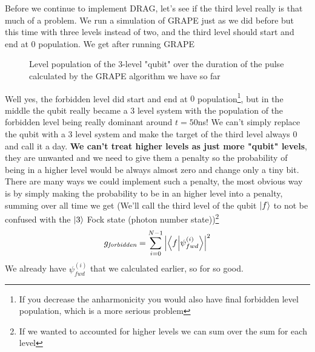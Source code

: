 Before we continue to implement DRAG, let's see if the third level really is that much of a problem. We run a simulation of GRAPE just as we did before but this time with three levels instead of two, and the third level should start and end at 0 population. We get after running GRAPE
\begin{figure}[H]
    \begin{center}
        
    \end{center}
    \caption{Level population of the 3-level "qubit" over the duration of the pulse calculated by the GRAPE algorithm we have so far}
    \label{fig:before-DRAG}
\end{figure}
Well yes, the forbidden level did start and end at $0$ population\footnote{If you decrease the anharmonicity you would also have final forbidden level population, which is a more serious problem}, but in the middle the qubit really became a 3 level system with the population of the forbidden level being really dominant around $t = 50$ns! We can't simply replace the qubit with a 3 level system and make the target of the third level always 0 and call it a day. \textbf{We can't treat higher levels as just more "qubit" levels}, they are unwanted and we need to give them a penalty so the probability of being in a higher level would be always almost zero and change only a tiny bit. There are many ways we could implement such a penalty, the most obvious way is by simply making the probability to be in an higher level into a penalty, summing over all time we get (We'll call the third level of the qubit $\ket{f}$ to not be confused with the $\ket{3}$ Fock state (photon number state))\footnote{If we wanted to accounted for higher levels we can sum over the sum for each level}
\[
    g_{\textit{forbidden}} = \sum_{i=0}^{N - 1} \abs{\braket{f}{\psi_{fwd}^{ (i)}}}^2 
\]
We already have $\psi_{fwd}^{ (i)}$ that we calculated earlier, so for so good.

